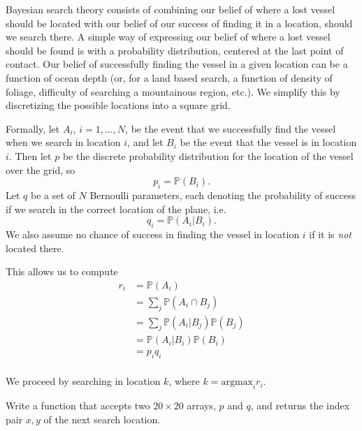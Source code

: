 Bayesian search theory consists of combining our belief of where a lost vessel should be located with our belief of our success of finding it in a location, should we search there. A simple way of expressing our belief of where a lost vessel should be found is with a probability distribution, centered at the last point of contact. Our belief of successfully finding the vessel in a given location can be a function of ocean depth (or, for a land based search, a function of density of foliage, difficulty of searching a mountainous region, etc.). We simplify this by discretizing the possible locations into a square grid.

Formally, let $A_{i}$, $i=1,...,N$, be the event that we successfully find the vessel when we search in location $i$, and let $B_{i}$ be the event that the vessel is in location $i$. Then let $p$ be the discrete probability distribution for the location of the vessel over the grid, so 
\begin{equation*}
p_{i} = \mathbb{P}(B_{i}).
\end{equation*}
Let $q$ be a set of $N$ Bernoulli parameters, each denoting the probability of success if we search in the correct location of the plane, i.e. 
$$q_{i} = \mathbb{P}(A_{i} | B_{i}).$$ We also assume no chance of success in finding the vessel in location $i$ if it is \emph{not} located there.

This allows us to compute 
\begin{align*}
r_{i} & = \mathbb{P}(A_{i}) \\
& = \sum_{j} \mathbb{P}(A_{i} \cap B_{j}) \\
& = \sum_{j} \mathbb{P}(A_{i} | B_{j})\mathbb{P}(B_{j}) \\
& = \mathbb{P}(A_{i} | B_{i})\mathbb{P}(B_{i}) \\
& = p_{i}q_{i} \\
\end{align*}

We proceed by searching in location $k$, where $k = \text{argmax}_{i} r_{i}$.

\begin{problem}
Write a function that accepts two $20 \times 20$ arrays, $p$ and $q$, and returns the index pair $x,y$ of the next search location.
\end{problem}

